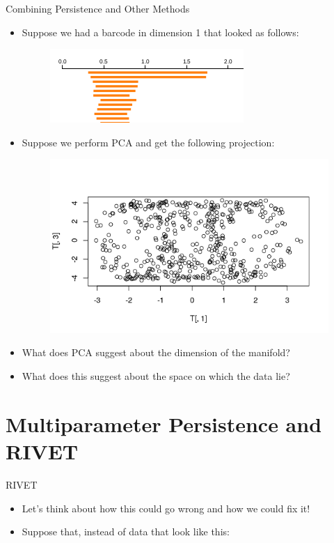 \documentclass[usenames,dvipsnames,aspectratio=1610]{beamer}
\begin{document}
\begin{frame}{Combining Persistence and Other Methods}
\begin{itemize}
\item Suppose we had a barcode in dimension 1 that looked as follows:
\begin{figure}
\includegraphics[scale=0.5]{images/torusbar.png}
\end{figure}
\item Suppose we perform PCA and get the following projection:
\begin{figure}
\includegraphics[scale=0.3]{images/torusPCA.png}
\end{figure}
\item What does PCA suggest about the dimension of the manifold? 
\item What does this suggest about the space on which the data lie?
\end{itemize}
\end{frame}


\section{Multiparameter Persistence and RIVET}
\begin{frame}{RIVET}
\begin{itemize}
\item<1-> Let's think about how this could go wrong and how we could fix it!
\item<2-> Suppose that, instead of data that look like this:
\begin{figure}
\end{figure} 
\end{itemize}
\end{frame}
\end{document}
